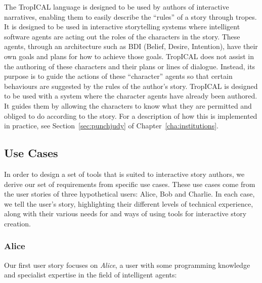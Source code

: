 \documentclass[11pt]{report}
\begin{document}
The TropICAL language is designed to be used by authors of interactive
narratives, enabling them to easily describe the ``rules'' of a story through
tropes. It is designed to be used in interactive storytelling systems where
intelligent software agents are acting out the roles of the characters in the
story. These agents, through an architecture such as BDI (Belief, Desire,
Intention), have their own goals and plans for how to achieve those goals.
TropICAL does not assist in the authoring of these characters and their plans or
lines of dialogue. Instead, its purpose is to guide the actions of these
``character'' agents so that certain behaviours are suggested by the rules of the author's
story. TropICAL is designed to be used with a system where the character agents have
already been authored. It guides them by allowing the characters to know what
they are permitted and obliged to do according to the story. For a description of how this is
implemented in practice, see Section~\ref{sec:punchjudy} of
Chapter~\ref{cha:institutions}.

\subsection{Use Cases}
\label{sec:use-cases}

In order to design a set of tools that is suited to interactive story authors, we derive our set of requirements from specific use
cases. These use cases come from the user stories of three hypothetical users: Alice, Bob and
Charlie. In each case, we tell the user's story, highlighting their different
levels of technical experience, along with
their various needs for and ways of using tools for
interactive story creation.

\subsubsection{Alice}

Our first user story focuses on \emph{Alice}, a user with some programming knowledge and
specialist expertise in the field of intelligent agents:
\end{document}
